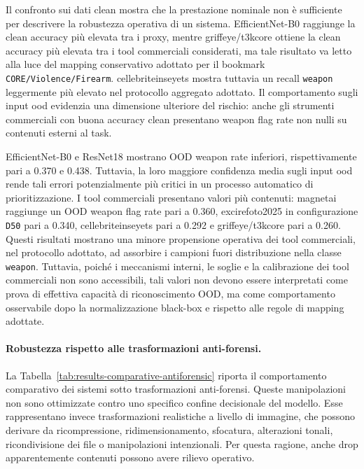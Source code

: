 Il confronto sui dati clean mostra che la prestazione nominale non è sufficiente
per descrivere la robustezza operativa di un sistema. EfficientNet-B0 raggiunge
la clean accuracy più elevata tra i proxy, mentre
\gls{griffeye}/\gls{t3kcore} ottiene la clean accuracy più elevata tra i tool
commerciali considerati, ma tale risultato va letto alla luce del mapping
conservativo adottato per il bookmark \texttt{CORE/Violence/Firearm}.
\gls{cellebriteinseyets} mostra tuttavia un recall \texttt{weapon} leggermente
più elevato nel protocollo aggregato adottato. Il comportamento sugli
input \gls{ood} evidenzia una dimensione ulteriore del rischio: anche gli
strumenti commerciali con buona accuracy clean presentano weapon flag rate non
nulli su contenuti esterni al task.

EfficientNet-B0 e ResNet18 mostrano OOD weapon rate inferiori, rispettivamente
pari a 0.370 e 0.438. Tuttavia, la loro maggiore confidenza media sugli input
\gls{ood} rende tali errori potenzialmente più critici in un processo automatico
di prioritizzazione. I tool commerciali presentano valori più contenuti:
\gls{magnetai} raggiunge un OOD weapon flag rate pari a 0.360,
\gls{excirefoto2025} in configurazione \texttt{D50} pari a 0.340,
\gls{cellebriteinseyets} pari a 0.292 e
\gls{griffeye}/\gls{t3kcore} pari a 0.260. Questi risultati mostrano una minore
propensione operativa dei tool commerciali, nel protocollo adottato, ad assorbire
i campioni fuori distribuzione nella classe \texttt{weapon}. Tuttavia, poiché i
meccanismi interni, le soglie e la calibrazione dei tool commerciali non sono
accessibili, tali valori non devono essere interpretati come prova di effettiva
capacità di riconoscimento OOD, ma come comportamento osservabile dopo la
normalizzazione black-box e rispetto alle regole di mapping adottate.

\paragraph{Robustezza rispetto alle trasformazioni anti-forensi.}

La Tabella~\ref{tab:results-comparative-antiforensic} riporta il comportamento
comparativo dei sistemi sotto trasformazioni anti-forensi. Queste manipolazioni
non sono ottimizzate contro uno specifico confine decisionale del modello. Esse
rappresentano invece trasformazioni realistiche a livello di immagine, che possono
derivare da ricompressione, ridimensionamento, sfocatura, alterazioni tonali,
ricondivisione dei file o manipolazioni intenzionali. Per questa ragione, anche
drop apparentemente contenuti possono avere rilievo operativo.


